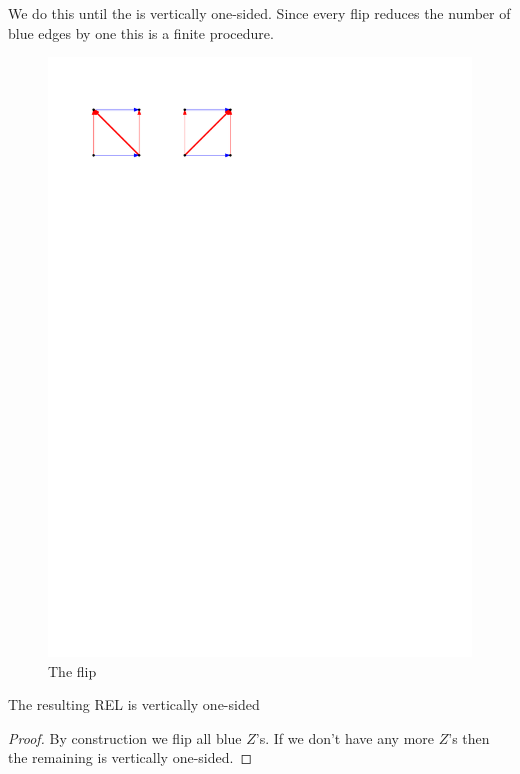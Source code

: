      We do this until the \rel is vertically one-sided. Since every flip reduces the number of blue edges by one this is a finite procedure.

    \begin{figure}[h]
      \centering
      \includegraphics[scale=1]{unifiedAlgo/img/zflip/flip.pdf}
      \caption{The flip}
      \label{fig:zflip:flip}
    \end{figure}

    \begin{lemma}
      \label{lm:sweep:vertOnsided}
      The resulting REL is vertically one-sided
    \end{lemma}
    \begin{proof}
      By construction we flip all blue $Z$'s. If we don't have any more $Z$'s then the remaining \rel is vertically one-sided. 
    \end{proof}

